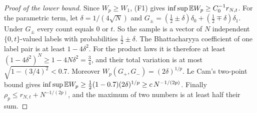 \documentclass[11pt]{amsart}
\theoremstyle{definition}
\theoremstyle{remark}
\begin{document}
\begin{proof}[Proof of the lower bound]
Since $W_p\ge W_1$, (F1) gives
$\inf\sup\mathbb{E} W_p\ge C_0^{-1}r_{N,t}$.  For the parametric term, let
$\delta=1/(4\sqrt N)$ and
$G_\pm=(\tfrac12\pm\delta)\delta_0+(\tfrac12\mp\delta)\delta_1$.  Under
$G_\pm$ every count equals $0$ or $t$.  So the sample is a vector of $N$
independent $\{0,t\}$-valued labels with probabilities $\frac12\pm\delta$.
The Bhattacharyya coefficient of one label pair is at least $1-4\delta^2$.
For the product laws it is therefore at least $(1-4\delta^2)^N\ge1-4N\delta^2=\frac34$,
and their total variation is at most $\sqrt{1-(3/4)^2}<0.7$.  Moreover
$W_p(G_+,G_-)=(2\delta)^{1/p}$.  Le Cam's two-point bound gives
$\inf\sup\mathbb{E} W_p\ge\frac12(1-0.7)(2\delta)^{1/p}\ge c\,N^{-1/(2p)}$.
Finally $\rho_p\le r_{N,t}+N^{-1/(2p)}$, and the maximum of two numbers is
at least half their sum.
\end{proof}
\end{document}
